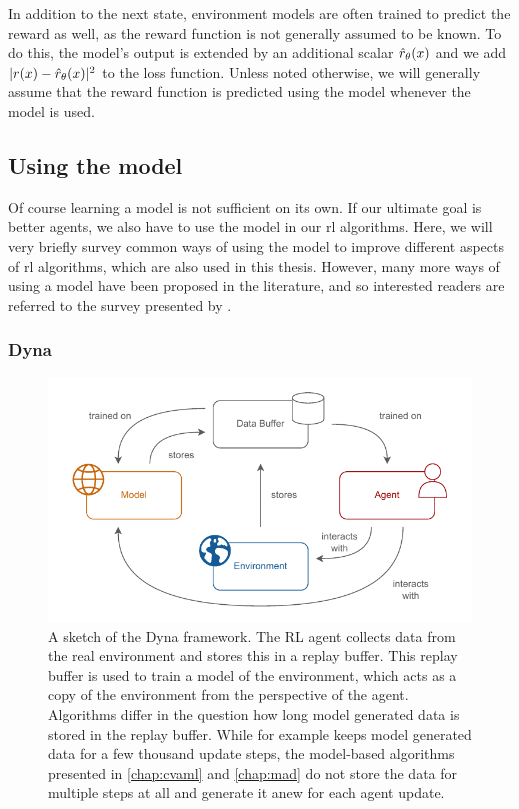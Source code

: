 In addition to the next state, environment models are often trained to predict the reward as well, as the reward function is not generally assumed to be known.
To do this, the model's output is extended by an additional scalar $\hat{r}_\theta(x)$ and we add $|r(x) - \hat{r}_\theta(x)|^2$ to the loss function.
Unless noted otherwise, we will generally assume that the reward function is predicted using the model whenever the model is used.

\subsection{Using the model}

Of course learning a model is not sufficient on its own.
If our ultimate goal is better agents, we also have to use the model in our \ac{rl} algorithms.
Here, we will very briefly survey common ways of using the model to improve different aspects of \ac{rl} algorithms, which are also used in this thesis.
However, many more ways of using a model have been proposed in the literature, and so interested readers are referred to the survey presented by \textcite{moerland}. 

\subsubsection{Dyna}

\begin{figure}
    \centering
    \includegraphics[width=.8\textwidth]{illustrations/thesis_background_dyna.pdf}
    \caption{A sketch of the Dyna framework. The RL agent collects data from the real environment and stores this in a replay buffer. This replay buffer is used to train a model of the environment, which acts as a copy of the environment from the perspective of the agent. Algorithms differ in the question how long model generated data is stored in the replay buffer. While \textcite{janner2019mbpo} for example keeps model generated data for a few thousand update steps, the model-based algorithms presented in \autoref{chap:cvaml} and \autoref{chap:mad} do not store the data for multiple steps at all and generate it anew for each agent update.}
    \label{fig:background:dyna}
\end{figure}


